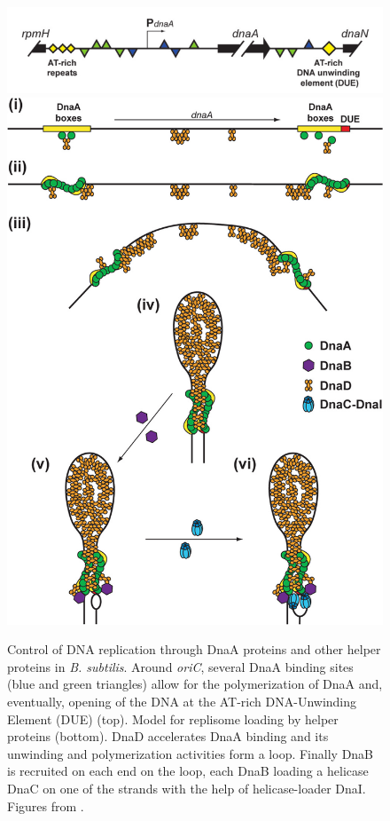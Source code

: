 \begin{figure}[!ht]
	\centering
	\includegraphics[width=0.8\linewidth]{figure/dnaABindingBoxes}
	\includegraphics[width=0.5\linewidth]{figure/dnaAPolymerizationModel}
	\caption{Control of DNA replication through DnaA proteins and other helper proteins in \textit{B. subtilis}. Around \textit{oriC}, several DnaA binding sites (blue and green triangles) allow for the polymerization of DnaA and, eventually, opening of the DNA at the AT-rich DNA-Unwinding Element (DUE) (top). Model for replisome loading by helper proteins (bottom). DnaD accelerates DnaA binding and its unwinding and polymerization activities form a loop. Finally DnaB is recruited on each end on the loop, each DnaB loading a helicase DnaC on one of the strands with the help of helicase-loader DnaI. Figures from \citet{briggs_chromosomal 2012}.}
	\label{fig:dnaA}
\end{figure}
